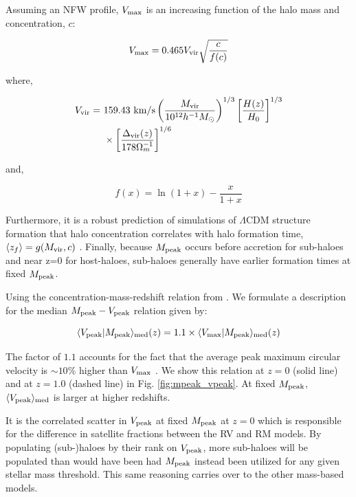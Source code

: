 \documentclass[a4paper,fleqn,usenatbib]{mnras}
\begin{document}
Assuming an NFW profile, $V_{\rm max}$ is an increasing function of the halo mass and concentration, $c$:
%
\begin{linenomath}
\begin{equation}
V_{\rm max} = 0.465V_{\rm vir}\sqrt{\frac{c}{f(c)}}
\end{equation}
\end{linenomath}
%
where,
\begin{linenomath}
\begin{align}
V_{\rm vir} = ~&159.43~{\rm km/s}\left(\frac{M_{\rm vir}}{10^{12}h^{-1}M_{\odot}}\right)^{1/3}\left[\frac{H(z)}{H_0}\right]^{1/3} \\ \nonumber
 &\times \left[\frac{\Delta_{\rm vir}(z)}{178\Omega^{-1}_m}\right]^{1/6}
\end{align}
\end{linenomath}
and,
%
\begin{linenomath}
\begin{equation}
f(x) = \ln(1+x) - \frac{x}{1+x}
\end{equation}
\end{linenomath}
Furthermore, it is a robust prediction of simulations of $\Lambda$CDM structure formation that halo concentration correlates with halo formation time, $\langle z_f \rangle = g(M_{\rm vir}, c)$ \citep[e.g.][]{Wechsler:2002kh}.  Finally, because $M_{\rm peak}$ occurs before accretion for sub-haloes and near z=0 for host-haloes, sub-haloes generally have earlier formation times at fixed $M_{\rm peak}$.   

Using the concentration-mass-redshift relation from \citet{Maccio:2009bs}.  We formulate a description for the median $M_{\rm peak}-V_{\rm peak}$ relation given by:
%
\begin{linenomath}
\begin{equation}
\label{eq:vpeak}
\langle V_{\rm peak} | M_{\rm peak}\rangle_{\rm med}(z) = 1.1\times \langle V_{\rm max}|M_{\rm peak}\rangle_{\rm med}(z)
\end{equation}
\end{linenomath}
%
The factor of $1.1$ accounts for the fact that the average peak maximum circular velocity is $\sim 10\%$ higher than $V_{\rm max}$ \citep{Behroozi:2014kk}.  We show this relation at $z=0$ (solid line) and at $z=1.0$ (dashed line) in Fig. \ref{fig:mpeak_vpeak}.  At fixed $M_{\rm peak}$, $\langle V_{\rm peak}\rangle_{\rm med}$ is larger at higher redshifts. 

It is the correlated scatter in $V_{\rm peak}$ at fixed $M_{\rm peak}$ at $z=0$ which is responsible for the difference in satellite fractions between the RV and RM models.  By populating (sub-)haloes by their rank on $V_{\rm peak}$, more sub-haloes will be populated than would have been had $M_{\rm peak}$ instead been utilized for any given stellar mass threshold.  This same reasoning carries over to the other mass-based models.  
\end{document}
